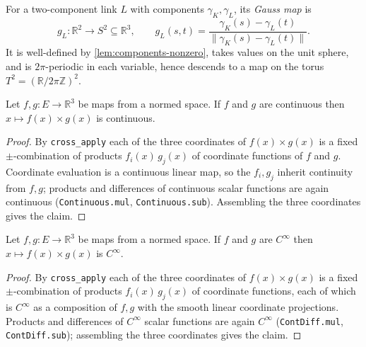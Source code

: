 \begin{definition}
    \label{def:gauss-map}
    For a two-component link $L$ with components $\gamma_K,\gamma_L$, its
    \emph{Gauss map} is
    \[
        g_L : \mathbb{R}^2 \to S^2 \subseteq \mathbb{R}^3, \qquad
        g_L(s,t) = \frac{\gamma_K(s) - \gamma_L(t)}{\lVert \gamma_K(s) - \gamma_L(t)\rVert}.
    \]
    It is well-defined by \cref{lem:components-nonzero}, takes values on the unit
    sphere, and is $2\pi$-periodic in each variable, hence descends to a map on the
    torus $T^2 = (\mathbb{R}/2\pi\mathbb{Z})^2$.
\end{definition}

\begin{lemma}
    \label{lem:crossProduct-continuous}
    Let $f,g : E\to\mathbb{R}^3$ be maps from a normed space. If $f$ and $g$ are
    continuous then $x\mapsto f(x)\times g(x)$ is continuous.
\end{lemma}
\begin{proof}
    By \texttt{cross\_apply} each of the three coordinates of $f(x)\times g(x)$ is a
    fixed $\pm$-combination of products $f_i(x)\,g_j(x)$ of coordinate functions of
    $f$ and $g$. Coordinate evaluation is a continuous linear map, so the $f_i,g_j$
    inherit continuity from $f,g$; products and differences of continuous scalar
    functions are again continuous (\texttt{Continuous.mul}, \texttt{Continuous.sub}).
    Assembling the three coordinates gives the claim.
\end{proof}

\begin{lemma}
    \label{lem:crossProduct-bilinear}
    \leanok
    Let $f,g : E\to\mathbb{R}^3$ be maps from a normed space. If $f$ and $g$ are
    $C^\infty$ then $x\mapsto f(x)\times g(x)$ is $C^\infty$.
\end{lemma}
\begin{proof}
    By \texttt{cross\_apply} each of the three coordinates of $f(x)\times g(x)$ is a
    fixed $\pm$-combination of products $f_i(x)\,g_j(x)$ of coordinate functions,
    each of which is $C^\infty$ as a composition of $f,g$ with the smooth linear
    coordinate projections. Products and differences of $C^\infty$ scalar functions
    are again $C^\infty$ (\texttt{ContDiff.mul}, \texttt{ContDiff.sub}); assembling
    the three coordinates gives the claim.
\end{proof}

